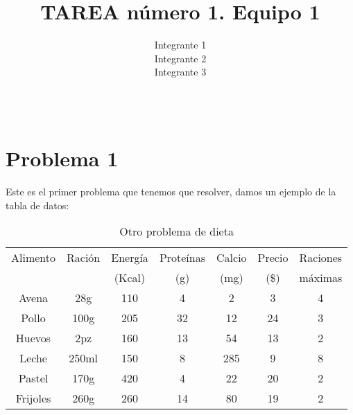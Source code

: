 \documentclass[12pt]{article}
\title{\textbf{TAREA número 1. Equipo 1}}
\author{Integrante 1\\ Integrante 2\\ Integrante 3}
\date{}
\begin{document}
\maketitle %

\section*{\\Problema 1}
Este es el primer problema que tenemos que resolver, damos un ejemplo de la tabla de datos:


\begin{table}[h]
        \centering %
        \small %
        \begin{tabular}{|c|c|c|c|c|c|c|} 
        \hline
          Alimento &Ración&Energía&Proteínas& Calcio&Precio& Raciones\\
          & & (Kcal)& (g)& (mg)& (\$)& máximas\\
          \hline\hline %
            Avena & 28g& 110& 4& 2& 3& 4\\
            \hline %
            Pollo & 100g& 205& 32& 12& 24& 3\\
            \hline
            Huevos& 2pz& 160& 13& 54& 13& 2\\
            \hline
            Leche& 250ml& 150& 8& 285& 9& 8\\
            \hline
            Pastel& 170g& 420& 4& 22& 20& 2\\
            \hline
            Frijoles& 260g& 260& 14& 80& 19& 2\\
            \hline
        \end{tabular}
        \caption{Otro problema de dieta} %
    \end{table}
\end{document}

